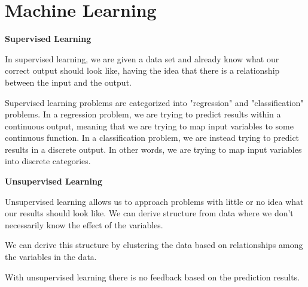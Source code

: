 \documentclass[12pt,a4paper]{article}
\begin{document}
\tableofcontents
\newpage

\section{Machine Learning}

\textbf{Supervised Learning}

In supervised learning, we are given a data set and already know what our correct output should look like, having the idea that there is a relationship between the input and the output.

Supervised learning problems are categorized into "regression" and "classification" problems. In a regression problem, we are trying to predict results within a continuous output, meaning that we are trying to map input variables to some continuous function. In a classification problem, we are instead trying to predict results in a discrete output. In other words, we are trying to map input variables into discrete categories.

\textbf{Unsupervised Learning}

Unsupervised learning allows us to approach problems with little or no idea what our results should look like. We can derive structure from data where we don't necessarily know the effect of the variables.

We can derive this structure by clustering the data based on relationships among the variables in the data.

With unsupervised learning there is no feedback based on the prediction results.
\end{document}
